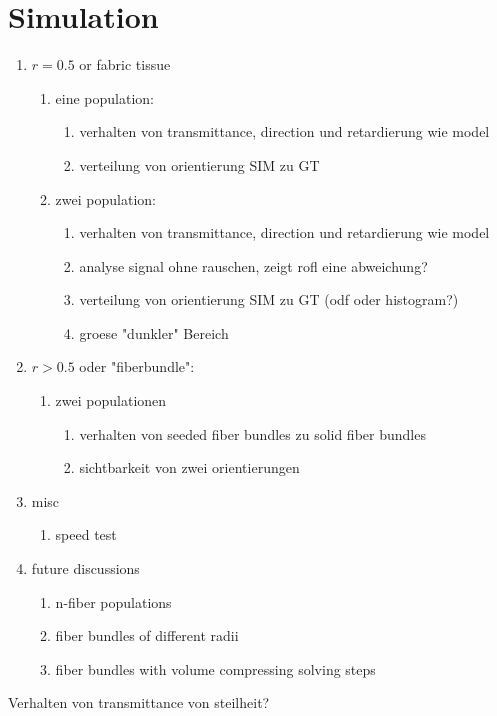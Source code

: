 \section{Simulation}
% 
\begin{enumerate}
\item $r=0.5$ or fabric tissue 
\begin{enumerate}
\item eine population:
\begin{enumerate}
    \item verhalten von transmittance, direction und retardierung wie model
    \item verteilung von orientierung SIM zu GT
\end{enumerate}
% 
\item zwei population:
\begin{enumerate}
    \item verhalten von transmittance, direction und retardierung wie model
    \item analyse signal ohne rauschen, zeigt rofl eine abweichung?
    \item verteilung von orientierung SIM zu GT (odf oder histogram?)
    \item groese "dunkler" Bereich
\end{enumerate}
\end{enumerate}
% 
\item $r > 0.5$ oder "fiberbundle":
\begin{enumerate}
\item zwei populationen
\begin{enumerate}
    \item verhalten von seeded fiber bundles zu solid fiber bundles
    \item sichtbarkeit von zwei orientierungen
\end{enumerate}
\end{enumerate}
% 
\item misc
\begin{enumerate}
    \item speed test
\end{enumerate}
% 
\item future discussions
\begin{enumerate}
    \item n-fiber populations
    \item fiber bundles of different radii
    \item fiber bundles with volume compressing solving steps
\end{enumerate}
\end{enumerate}
% 
Verhalten von transmittance von steilheit?
% 
% 
% 
